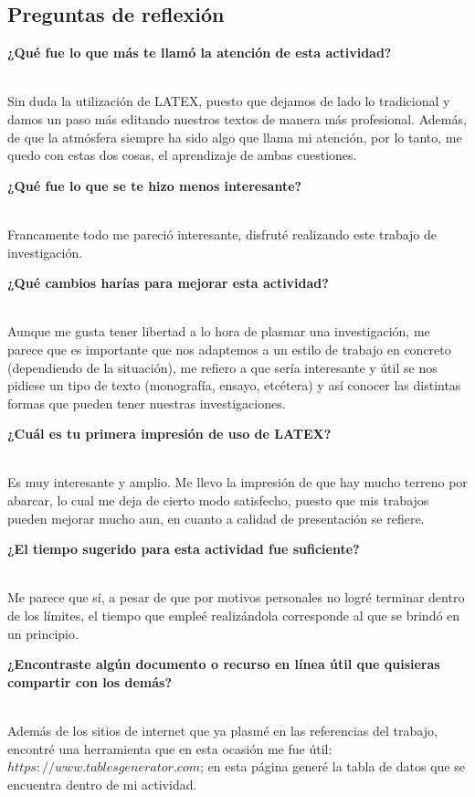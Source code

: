 \documentclass{article}
\begin{document}
\pagebreak
\begin{doublespace}

\begin{center}
\section*{Preguntas de reflexión}
\end{center}

\begin{itemize}
{\item \bfseries ¿Qué fue lo que más te llamó la atención de esta actividad?}
\\
Sin duda la utilización de LATEX, puesto que dejamos de lado lo tradicional y damos un paso más editando nuestros textos de manera más profesional. Además, de que la atmósfera siempre ha sido algo que llama mi atención, por lo tanto, me quedo con estas dos cosas, el aprendizaje de ambas cuestiones.

{\item \bfseries ¿Qué fue lo que se te hizo menos interesante?}
\\
Francamente todo me pareció interesante, disfruté realizando este trabajo de investigación.

{\item \bfseries ¿Qué cambios harías para mejorar esta actividad?}
\\
Aunque me gusta tener libertad a lo hora de plasmar una investigación, me parece que es importante que nos adaptemos a un estilo de trabajo en concreto (dependiendo de la situación), me refiero a que sería interesante y útil se nos pidiese un tipo de texto (monografía, ensayo, etcétera) y así conocer las distintas formas que pueden tener nuestras investigaciones.

{\item \bfseries ¿Cuál es tu primera impresión de uso de LATEX?}
\\
Es muy interesante y amplio. Me llevo la impresión de que hay mucho terreno por abarcar, lo cual me deja de cierto modo satisfecho, puesto que mis trabajos pueden mejorar mucho aun, en cuanto a calidad de presentación se refiere.

{\item \bfseries ¿El tiempo sugerido para esta actividad fue suficiente?}
\\
Me parece que sí, a pesar de que por motivos personales no logré terminar dentro de los límites, el tiempo que empleé realizándola corresponde al que se brindó en un principio.

{\item \bfseries ¿Encontraste algún documento o recurso en línea útil que quisieras compartir con los demás?}
\\
Además de los sitios de internet que ya plasmé en las referencias del trabajo, encontré una herramienta que en esta ocasión me fue útil: $https://www.tablesgenerator.com$; en esta página generé la tabla de datos que se encuentra dentro de mi actividad.

\end{itemize}
\end{doublespace}
\end{document}
